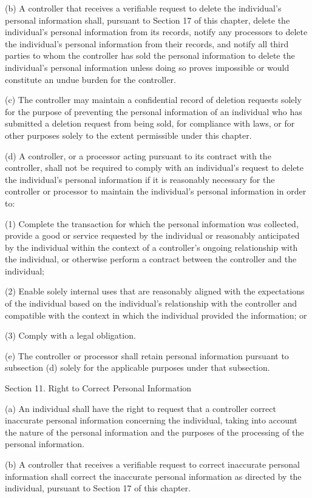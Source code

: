 (b) A controller that receives a verifiable request to delete the individual’s personal information shall, pursuant to Section 17 of this chapter, delete the individual’s personal information from its records, notify any processors to delete the individual’s personal information from their records, and notify all third parties to whom the controller has sold the personal information to delete the individual’s personal information unless doing so proves impossible or would constitute an undue burden for the controller.

(c) The controller may maintain a confidential record of deletion requests solely for the purpose of preventing the personal information of an individual who has submitted a deletion request from being sold, for compliance with laws, or for other purposes solely to the extent permissible under this chapter.

(d) A controller, or a processor acting pursuant to its contract with the controller, shall not be required to comply with an individual’s request to delete the individual’s personal information if it is reasonably necessary for the controller or processor to maintain the individual’s personal information in order to:

(1) Complete the transaction for which the personal information was collected, provide a good or service requested by the individual or reasonably anticipated by the individual within the context of a controller’s ongoing relationship with the individual, or otherwise perform a contract between the controller and the individual;

(2) Enable solely internal uses that are reasonably aligned with the expectations of the individual based on the individual’s relationship with the controller and compatible with the context in which the individual provided the information; or

(3) Comply with a legal obligation.

(e) The controller or processor shall retain personal information pursuant to subsection (d) solely for the applicable purposes under that subsection.

Section 11. Right to Correct Personal Information

(a) An individual shall have the right to request that a controller correct inaccurate personal information concerning the individual, taking into account the nature of the personal information and the purposes of the processing of the personal information.

(b) A controller that receives a verifiable request to correct inaccurate personal information shall correct the inaccurate personal information as directed by the individual, pursuant to Section 17 of this chapter.

